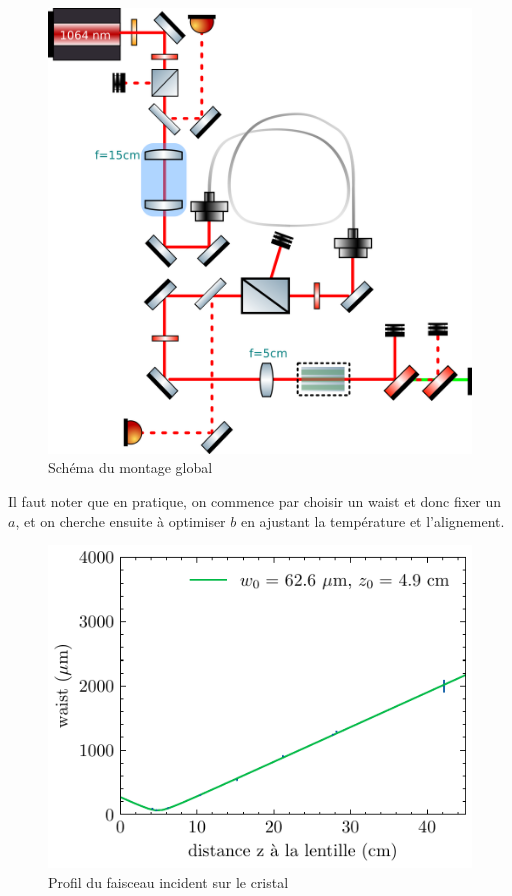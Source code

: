 \documentclass[11pt,a4paper] { article}
\begin{document}
\begin{figure}[h]
	\centering
	\includegraphics{./img/schema global.png}
	\caption{Schéma du montage global}
	\label{fig:global}
\end{figure}


Il faut noter que en pratique, on commence par choisir un waist et donc fixer un $a$, et on cherche ensuite à optimiser $b$ en ajustant la température et l'alignement.



\begin{figure}[h]
    \centering
    \includegraphics{../donnees/waist faisceau incident.pdf}
    \caption{Profil du faisceau incident sur le cristal}
\end{figure}
\end{document}
